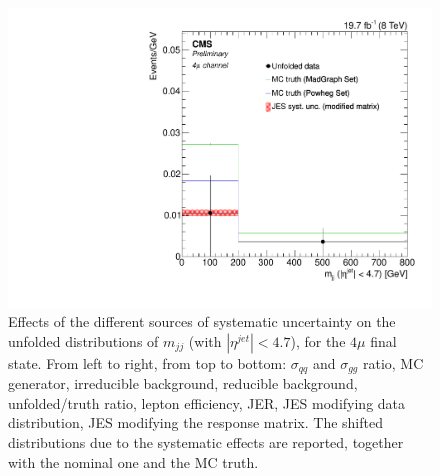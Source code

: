\begin{figure}[hbtp]
\begin{center}
    \includegraphics[width=0.8\cmsFigWidth]{Figures/Unfolding/Systematics/ZZTo4m_Mjj_JES_ModMat_Mad_fr}
    \caption{Effects of the different sources of systematic uncertainty on the unfolded distributions of $m_{jj}$ (with $|\eta^{jet}|<4.7$), for the $4\mu$ final state. From left to right, from top to bottom: $\sigma_{qq}$ and $\sigma_{gg}$ ratio, MC generator, irreducible background, reducible background, unfolded/truth ratio, lepton efficiency, JER, JES modifying data distribution, JES modifying the response matrix. The shifted distributions due to the systematic effects are reported, together with the nominal one and the MC truth.}
    \label{fig:Mjj_syst_4m}
  \end{center}
\end{figure}

